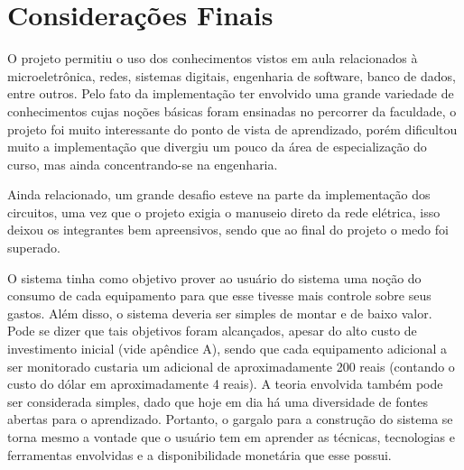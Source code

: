 \chapter{Considerações Finais}
\label{Cap:consideracoes_finais}

O projeto permitiu o uso dos conhecimentos vistos em aula relacionados à microeletrônica, redes, sistemas digitais, engenharia de software, banco de dados, entre outros. Pelo fato da implementação ter envolvido uma grande variedade de conhecimentos cujas noções básicas foram ensinadas no percorrer da faculdade, o projeto foi muito interessante do ponto de vista de aprendizado, porém dificultou muito a implementação que divergiu um pouco da área de especialização do curso, mas ainda concentrando-se na engenharia.

Ainda relacionado, um grande desafio esteve na parte da implementação dos circuitos, uma vez que o projeto exigia o manuseio direto da rede elétrica, isso deixou os integrantes bem apreensivos, sendo que ao final do projeto o medo foi superado.

O sistema tinha como objetivo prover ao usuário do sistema uma noção do consumo de cada equipamento para que esse tivesse mais controle sobre seus gastos. Além disso, o sistema deveria ser simples de montar e de baixo valor. Pode se dizer que tais objetivos foram alcançados, apesar do alto custo de investimento inicial (vide apêndice A), sendo que cada equipamento adicional a ser monitorado custaria um adicional de aproximadamente 200 reais (contando o custo do dólar em aproximadamente 4 reais). A teoria envolvida também pode ser considerada simples, dado que hoje em dia há uma diversidade de fontes abertas para o aprendizado. Portanto, o gargalo para a construção do sistema se torna mesmo a vontade que o usuário tem em aprender as técnicas, tecnologias e ferramentas envolvidas e a disponibilidade monetária que esse possui.